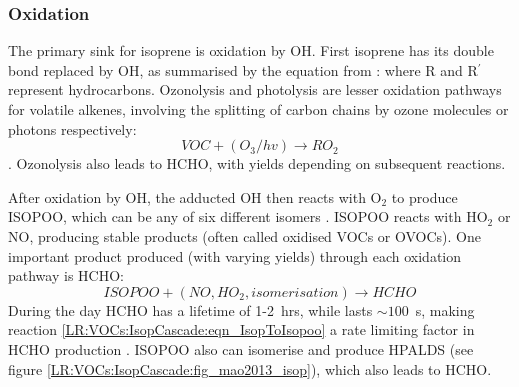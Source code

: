    \subsubsection{Oxidation}
      \label{LR:VOCs:IsopCascade:Oxidation}
      The primary sink for isoprene is oxidation by OH.
      First isoprene has its double bond replaced by OH, as summarised by the equation from \textcite{Patchen2007}:
      where R and R$^{\prime}$ represent hydrocarbons.
      Ozonolysis and photolysis are lesser oxidation pathways for volatile alkenes, involving the splitting of carbon chains by ozone molecules or photons respectively:
      \begin{equation*}
        VOC + (O_3/hv) \rightarrow RO_2
      \end{equation*}
      \parencite{Nguyen2016,Wolfe2016}.
      Ozonolysis also leads to HCHO, with yields depending on subsequent reactions.
      
      After oxidation by OH, the adducted OH then reacts with O$_2$ to produce ISOPOO, which can be any of six different isomers \parencite{Patchen2007}.
      ISOPOO reacts with HO$_2$ or NO, producing stable products (often called oxidised VOCs or OVOCs).
      One important product produced (with varying yields) through each oxidation pathway is HCHO: 
      \begin{equation*}
        ISOPOO + (NO, HO_2, isomerisation) \rightarrow HCHO 
      \end{equation*}
      During the day HCHO has a lifetime of 1-2~hrs, while \roo lasts $\sim 100$~s, making reaction \ref{LR:VOCs:IsopCascade:eqn_IsopToIsopoo} a rate limiting factor in HCHO production \parencite{Wolfe2016}.
      ISOPOO also can isomerise and produce HPALDS (see figure \ref{LR:VOCs:IsopCascade:fig_mao2013_isop}), which also leads to HCHO.
      
      
      
      
